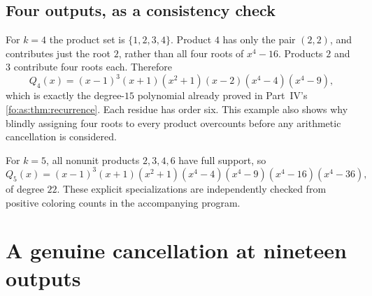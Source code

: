 \documentclass[11pt,a4paper]{article}
\numberwithin{equation}{section}
\theoremstyle{definition}
\theoremstyle{remark}
\begin{document}
\subsection{Four outputs, as a consistency check}
For $k=4$ the product set is $\{1,2,3,4\}$. Product $4$ has only the
pair $(2,2)$, and contributes just the root $2$, rather than all four roots
of $x^4-16$. Products $2$ and $3$ contribute four roots each. Therefore
\begin{equation}\label{sc:eq:Q4}
 Q_4(x)=(x-1)^3(x+1)(x^2+1)(x-2)(x^4-4)(x^4-9),
\end{equation}
which is exactly the degree-$15$ polynomial already proved in
Part~IV's \cref{fo:as:thm:recurrence}. Each residue has order six. This example
also shows why blindly assigning four roots to every product overcounts
before any arithmetic cancellation is considered.

For $k=5$, all nonunit products $2,3,4,6$ have full support, so
\[
 Q_5(x)=(x-1)^3(x+1)(x^2+1)
          (x^4-4)(x^4-9)(x^4-16)(x^4-36),
\]
of degree $22$. These explicit specializations are independently checked
from positive coloring counts in the accompanying program.

\section{A genuine cancellation at nineteen outputs}\label{sc:sec:nineteen}
\end{document}
